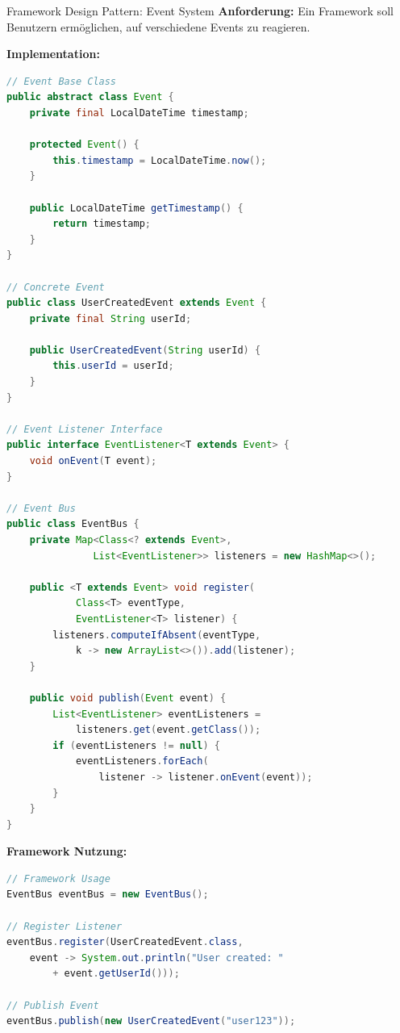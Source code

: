 \begin{example2}{Framework Design Pattern: Event System}
\textbf{Anforderung:}
Ein Framework soll Benutzern ermöglichen, auf verschiedene Events zu reagieren.

\textbf{Implementation:}
\begin{lstlisting}[language=Java, style=base]
// Event Base Class
public abstract class Event {
    private final LocalDateTime timestamp;
    
    protected Event() {
        this.timestamp = LocalDateTime.now();
    }
    
    public LocalDateTime getTimestamp() {
        return timestamp;
    }
}

// Concrete Event
public class UserCreatedEvent extends Event {
    private final String userId;
    
    public UserCreatedEvent(String userId) {
        this.userId = userId;
    }
}

// Event Listener Interface
public interface EventListener<T extends Event> {
    void onEvent(T event);
}

// Event Bus
public class EventBus {
    private Map<Class<? extends Event>, 
               List<EventListener>> listeners = new HashMap<>();
    
    public <T extends Event> void register(
            Class<T> eventType, 
            EventListener<T> listener) {
        listeners.computeIfAbsent(eventType, 
            k -> new ArrayList<>()).add(listener);
    }
    
    public void publish(Event event) {
        List<EventListener> eventListeners = 
            listeners.get(event.getClass());
        if (eventListeners != null) {
            eventListeners.forEach(
                listener -> listener.onEvent(event));
        }
    }
}
\end{lstlisting}

\textbf{Framework Nutzung:}
\begin{lstlisting}[language=Java, style=base]
// Framework Usage
EventBus eventBus = new EventBus();

// Register Listener
eventBus.register(UserCreatedEvent.class, 
    event -> System.out.println("User created: " 
        + event.getUserId()));

// Publish Event
eventBus.publish(new UserCreatedEvent("user123"));
\end{lstlisting}
\end{example2}

